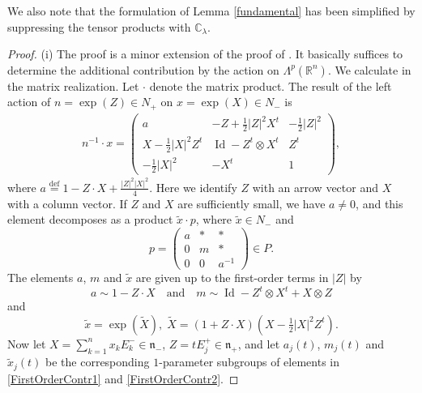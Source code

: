 \documentclass[a4paper,12pt,reqno]{amsart}
\numberwithin{theorem}{subsection}
\numberwithin{equation}{section}
\begin{document}
We also note that the formulation of Lemma \ref{fundamental} has been
simplified by suppressing the tensor products with ${\mathbb{C}}_\lambda$.

\begin{proof} (i) The proof is a minor extension of the proof of \cite[Lemma 4.1]{koss}.
It basically suffices to determine the additional contribution by the action on
$\Lambda^p({\mathbb{R}}^{n})$. We calculate in the matrix realization. Let $\cdot$ denote
the matrix product. The result of the left action of $n=\exp(Z) \in N_+$ on
$x=\exp(X)\in N_-$ is
\begin{align*}
   n^{-1} \cdot x =
   \begin{pmatrix}
   a & -Z + \tfrac 12 {\lvert{Z}\rvert}^2 X^t & -\tfrac 12 {\lvert{Z}\rvert}^2 \\
   X - \tfrac 12 {\lvert{X}\rvert}^2 Z^t & {\operatorname{Id}} - Z^t \otimes X^t & Z^t \\
   -\tfrac 12 {\lvert{X}\rvert}^2 & -X^t & 1
   \end{pmatrix},
\end{align*}
where $a {\stackrel{\text{def}}{=}} 1 - Z \cdot X + \tfrac{{\lvert{Z}\rvert}^2{\lvert{X}\rvert}^2}{4}$. Here we identify
$Z$ with an arrow vector and $X$ with a column vector. If $Z$ and $X$ are
sufficiently small, we have $a \ne 0$, and this element decomposes as a product
$\tilde{x} \cdot p$, where $\tilde{x} \in N_-$ and
\begin{equation*}
   p = \begin{pmatrix} a & * & * \\ 0 & m &*\\ 0 & 0 & a^{-1} \end{pmatrix}\in P.
\end{equation*}
The elements $a$, $m$ and $\tilde{x}$ are given up to the first-order terms in
${\lvert{Z}\rvert}$ by
\begin{equation}\label{FirstOrderContr1}
   a \sim 1 - Z \cdot X \quad \mbox{and} \quad m \sim {\operatorname{Id}} - Z^t \otimes X^t + X \otimes Z
\end{equation}
and
\begin{equation}\label{FirstOrderContr2}
   \tilde{x} = \exp (\tilde{X}), \; \tilde{X} = (1+ Z \cdot X) (X - \tfrac{1}{2} {\lvert{X}\rvert}^2 Z^t).
\end{equation}
Now let $X=\sum_{k=1}^n x_k E^-_k \in {{\mathfrak n}}_-$, $Z = tE_j^+ \in {{\mathfrak n}}_+$, and let
$a_j(t)$, $m_j(t)$ and $\tilde{x}_j(t)$ be the corresponding $1$-parameter
subgroups of elements in \eqref{FirstOrderContr1} and \eqref{FirstOrderContr2}.

\end{proof}
\end{document}
